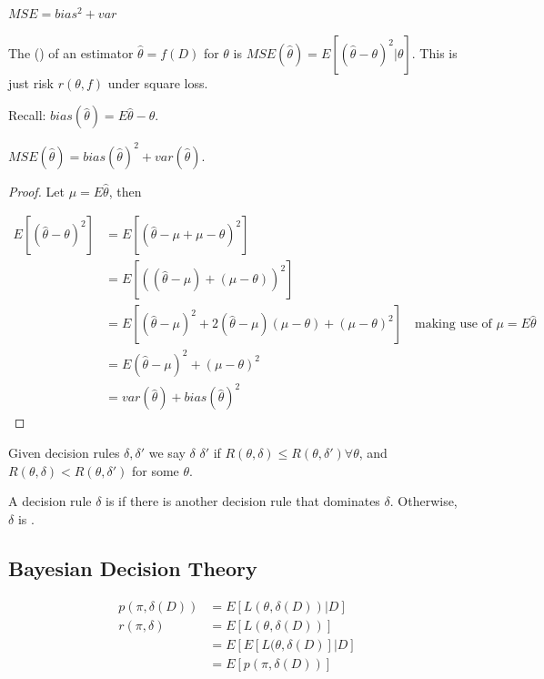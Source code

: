 $MSE = bias^2 + var$

\begin{defn}
    The  () of an estimator $\hat\theta = f(D)$ for $\theta$ is $MSE(\hat\theta) = E[(\hat\theta - \theta)^2 | \theta]$. This is just risk $r(\theta, f)$ under square loss.
\end{defn}

Recall: $bias(\hat\theta) = E \hat\theta - \theta$.

\begin{thm}
    $MSE(\hat\theta) = bias(\hat\theta)^2 + var(\hat\theta)$.
\end{thm}

\begin{proof}
    Let $\mu = E\hat\theta$, then

    \begin{align}
        E[(\hat\theta - \theta)^2] &= E[(\hat\theta - \mu + \mu - \theta)^2] \\
        &= E[((\hat\theta - \mu) + (\mu - \theta))^2] \\
        &= E[(\hat\theta - \mu)^2 + 2 (\hat\theta - \mu)(\mu - \theta) + (\mu - \theta)^2] \quad \text{making use of $\mu = E\hat\theta$}\\
        &= E(\hat\theta - \mu)^2 + (\mu - \theta)^2 \\
        &= var(\hat\theta) + bias(\hat\theta)^2
    \end{align}
\end{proof}

\begin{defn}
    Given decision rules $\delta, \delta'$ we say $\delta$  $\delta'$ if $R(\theta, \delta) \leq R(\theta, \delta') \forall \theta$, and $R(\theta, \delta) < R(\theta, \delta')$ for some $\theta$.
\end{defn}

\begin{defn}
    A decision rule $\delta$ is  if there is another decision rule that dominates $\delta$. Otherwise, $\delta$ is .
\end{defn}

\subsection{Bayesian Decision Theory}

\begin{align*}
    p(\pi, \delta(D)) &= E[L(\theta, \delta(D)) | D] \\
    r(\pi, \delta) &= E[L(\theta, \delta(D))] \\
    &= E[E[L(\theta, \delta(D)] | D] \\
    &= E[p(\pi, \delta(D))]
\end{align*}

